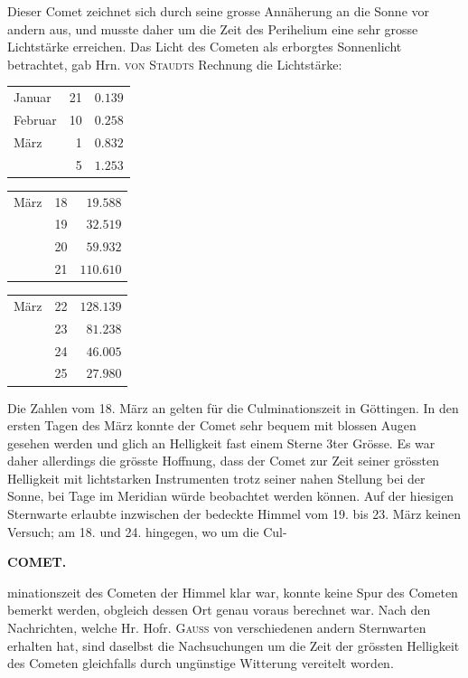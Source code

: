 Dieser Comet zeichnet sich durch seine grosse Annäherung an die Sonne vor andern aus, und musste daher um die Zeit des Perihelium eine sehr grosse Lichtstärke erreichen. Das Licht des Cometen als erborgtes Sonnenlicht betrachtet, gab Hrn. \textsc{von Staudts} Rechnung die Lichtstärke:

\begin{center}
\begin{tabular}{lr|r}
Januar & 21 & $0.139$ \\
Februar & 10 & $0.258$ \\
März & 1 & $0.832$ \\
& 5 & $1.253$ \\
\end{tabular}
\end{center}
\begin{center}
\begin{tabular}{lr|r}
März & 18 & $19.588$ \\
& 19 & $32.519$ \\
& 20 & $59.932$ \\
& 21 & $110.610$ \\
\end{tabular}
\end{center}
\begin{center}
\begin{tabular}{lr|r}
März & 22 & $128.139$ \\
& 23 & $81.238$ \\
& 24 & $46.005$ \\
& 25 & $27.980$ \\
\end{tabular}
\end{center}

Die Zahlen vom 18. März an gelten für die Culminationszeit in Göttingen. In den ersten Tagen
des März konnte der Comet sehr bequem mit blossen Augen gesehen werden und glich an Helligkeit
fast einem Sterne 3ter Grösse. Es war daher allerdings die grösste Hoffnung, dass der Comet zur Zeit
seiner grössten Helligkeit mit lichtstarken Instrumenten trotz seiner nahen Stellung bei der Sonne, bei
Tage im Meridian würde beobachtet werden können. Auf der hiesigen Sternwarte erlaubte inzwischen
der bedeckte Himmel vom 19. bis 23. März keinen Versuch; am 18. und 24. hingegen, wo um die Cul-\par
\clearpage
\thispagestyle{empty}
\noindent{}%
\makebox[12mm][l]{}%
\parbox[t]{\dimexpr\linewidth-24mm\relax}{\centering\footnotesize\bfseries COMET.\par}%
\par\nobreak\medskip
\noindent minationszeit des Cometen der Himmel klar war, konnte keine Spur des Cometen bemerkt werden, obgleich dessen Ort genau voraus berechnet war. Nach den Nachrichten, welche Hr. Hofr. \textsc{Gauss} von
verschiedenen andern Sternwarten erhalten hat, sind daselbst die Nachsuchungen um die Zeit der grössten Helligkeit des Cometen gleichfalls durch ungünstige Witterung vereitelt worden.
